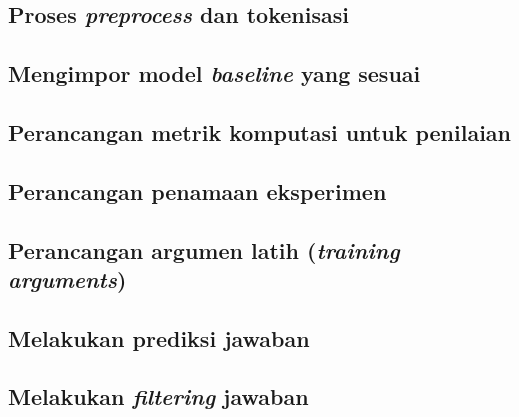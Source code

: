 \subsection{Proses \emph{preprocess} dan tokenisasi}

\subsection{Mengimpor model \emph{baseline} yang sesuai}

\subsection{Perancangan metrik komputasi untuk penilaian}

\subsection{Perancangan penamaan eksperimen}

\subsection{Perancangan argumen latih (\emph{training arguments})}

\subsection{Melakukan prediksi jawaban}

\subsection{Melakukan \emph{filtering} jawaban}

